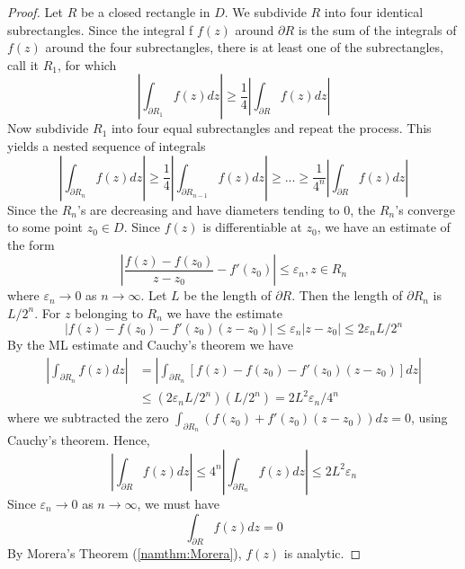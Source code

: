 \documentclass[12pt, a4paper, oneside, openright, titlepage]{book}
\begin{document}
\begin{proof}
    Let $R$ be a closed rectangle in $D$. We subdivide $R$ into four identical subrectangles. Since the integral f $f(z)$ around $\partial R$ is the sum of the integrals of $f(z)$ around the four subrectangles, there is at least one of the subrectangles, call it $R_1$, for which \begin{equation*}
        \left|\int_{\partial R_1}f(z)dz\right| \geq \frac{1}{4}\left|\int_{\partial R}f(z)dz\right|
    \end{equation*}
    Now subdivide $R_1$ into four equal subrectangles and repeat the process. This yields a nested sequence of integrals \begin{equation*}
        \left|\int_{\partial R_n}f(z)dz\right| \geq \frac{1}{4}\left|\int_{\partial R_{n-1}}f(z)dz\right| \geq ... \geq \frac{1}{4^n}\left|\int_{\partial R}f(z)dz\right|
    \end{equation*}
    Since the $R_n$'s are decreasing and have diameters tending to $0$, the $R_n$'s converge to some point $z_0 \in D$. Since $f(z)$ is differentiable at $z_0$, we have an estimate of the form \begin{equation*}
        \left|\frac{f(z)-f(z_0)}{z-z_0} - f'(z_0)\right| \leq \varepsilon_n, z \in R_n
    \end{equation*}
    where $\varepsilon_n\rightarrow 0$ as $n\rightarrow \infty$. Let $L$ be the length of $\partial R$. Then the length of $\partial R_n$ is $L/2^n$. For $z$ belonging to $R_n$ we have the estimate \begin{equation*}
        |f(z) - f(z_0) - f'(z_0)(z-z_0)| \leq \varepsilon_n|z-z_0| \leq 2\varepsilon_nL/2^n
    \end{equation*}
    By the ML estimate and Cauchy's theorem we have \begin{align*}
        \left|\int_{\partial R_n}f(z)dz\right| &= \left|\int_{\partial R_n}[f(z)-f(z_0)-f'(z_0)(z-z_0)]dz\right| \\
        &\leq (2\varepsilon_nL/2^n)(L/2^n) = 2L^2\varepsilon_n/4^n
    \end{align*}
    where we subtracted the zero $\int_{\partial R_n}(f(z_0)+f'(z_0)(z-z_0))dz =0$, using Cauchy's theorem. Hence, \begin{equation*}
        \left|\int_{\partial R}f(z)dz\right| \leq 4^n\left|\int_{\partial R_n}f(z)dz\right| \leq 2L^2\varepsilon_n
    \end{equation*}
    Since $\varepsilon_n\rightarrow 0$ as $n\rightarrow \infty$, we must have \begin{equation*}
        \int_{\partial R}f(z)dz = 0
    \end{equation*}
    By Morera's Theorem (\ref{namthm:Morera}), $f(z)$ is analytic.
\end{proof}
\end{document}

